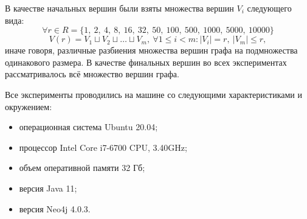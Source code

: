 \documentclass[14pt]{matmex-diploma-custom}
\theoremstyle{definition}
\begin{document}
В качестве начальных вершин были взяты множества вершин $V_i$ следующего вида:
    $$ \forall r \in R = \{1,~2,~4,~8,~16,~32,~50,~100, ~500, ~1000, ~5000, ~10000\} $$
    $$ V(r) = V_1 \sqcup V_2 \sqcup \dots \sqcup V_m,~ \forall 1 \leq i < m: |V_i|=r,~|V_m| \leq r,$$
    иначе говоря, различные разбиения множества вершин графа на подмножества одинакового размера.
 В качестве финальных вершин во всех экспериментах рассматривалось всё множество вершин графа.
 
 Все эксперименты проводились на машине со следующими характеристиками и окружением:
\begin{itemize}
    \item  операционная система Ubuntu 20.04;
    \item процессор Intel Core i7-6700 CPU, 3.40GHz;
    \item объем оперативной памяти 32 Гб;
    \item версия Java 11;
    \item версия Neo4j 4.0.3.
\end{itemize}
\end{document}
